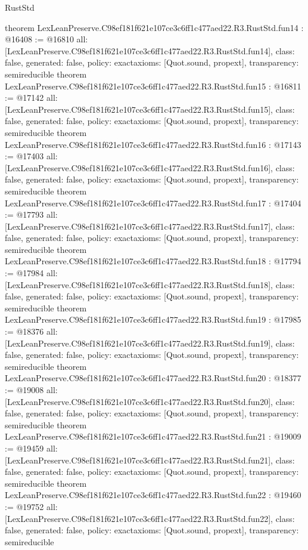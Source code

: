 \begin{lexlean}{RustStd}
\begin{coremodule}
{}
theorem LexLeanPreserve.C98ef181f621e107ce3c6ff1c477aed22.R3.RustStd.fun14 : @16408 := @16810 {
  all: [LexLeanPreserve.C98ef181f621e107ce3c6ff1c477aed22.R3.RustStd.fun14],
  class: false,
  generated: false,
  policy: exact{axioms: [Quot.sound, propext]},
  transparency: semireducible
}
theorem LexLeanPreserve.C98ef181f621e107ce3c6ff1c477aed22.R3.RustStd.fun15 : @16811 := @17142 {
  all: [LexLeanPreserve.C98ef181f621e107ce3c6ff1c477aed22.R3.RustStd.fun15],
  class: false,
  generated: false,
  policy: exact{axioms: [Quot.sound, propext]},
  transparency: semireducible
}
theorem LexLeanPreserve.C98ef181f621e107ce3c6ff1c477aed22.R3.RustStd.fun16 : @17143 := @17403 {
  all: [LexLeanPreserve.C98ef181f621e107ce3c6ff1c477aed22.R3.RustStd.fun16],
  class: false,
  generated: false,
  policy: exact{axioms: [Quot.sound, propext]},
  transparency: semireducible
}
theorem LexLeanPreserve.C98ef181f621e107ce3c6ff1c477aed22.R3.RustStd.fun17 : @17404 := @17793 {
  all: [LexLeanPreserve.C98ef181f621e107ce3c6ff1c477aed22.R3.RustStd.fun17],
  class: false,
  generated: false,
  policy: exact{axioms: [Quot.sound, propext]},
  transparency: semireducible
}
theorem LexLeanPreserve.C98ef181f621e107ce3c6ff1c477aed22.R3.RustStd.fun18 : @17794 := @17984 {
  all: [LexLeanPreserve.C98ef181f621e107ce3c6ff1c477aed22.R3.RustStd.fun18],
  class: false,
  generated: false,
  policy: exact{axioms: [Quot.sound, propext]},
  transparency: semireducible
}
theorem LexLeanPreserve.C98ef181f621e107ce3c6ff1c477aed22.R3.RustStd.fun19 : @17985 := @18376 {
  all: [LexLeanPreserve.C98ef181f621e107ce3c6ff1c477aed22.R3.RustStd.fun19],
  class: false,
  generated: false,
  policy: exact{axioms: [Quot.sound, propext]},
  transparency: semireducible
}
theorem LexLeanPreserve.C98ef181f621e107ce3c6ff1c477aed22.R3.RustStd.fun20 : @18377 := @19008 {
  all: [LexLeanPreserve.C98ef181f621e107ce3c6ff1c477aed22.R3.RustStd.fun20],
  class: false,
  generated: false,
  policy: exact{axioms: [Quot.sound, propext]},
  transparency: semireducible
}
theorem LexLeanPreserve.C98ef181f621e107ce3c6ff1c477aed22.R3.RustStd.fun21 : @19009 := @19459 {
  all: [LexLeanPreserve.C98ef181f621e107ce3c6ff1c477aed22.R3.RustStd.fun21],
  class: false,
  generated: false,
  policy: exact{axioms: [Quot.sound, propext]},
  transparency: semireducible
}
theorem LexLeanPreserve.C98ef181f621e107ce3c6ff1c477aed22.R3.RustStd.fun22 : @19460 := @19752 {
  all: [LexLeanPreserve.C98ef181f621e107ce3c6ff1c477aed22.R3.RustStd.fun22],
  class: false,
  generated: false,
  policy: exact{axioms: [Quot.sound, propext]},
  transparency: semireducible
}
\end{coremodule}
\end{lexlean}
